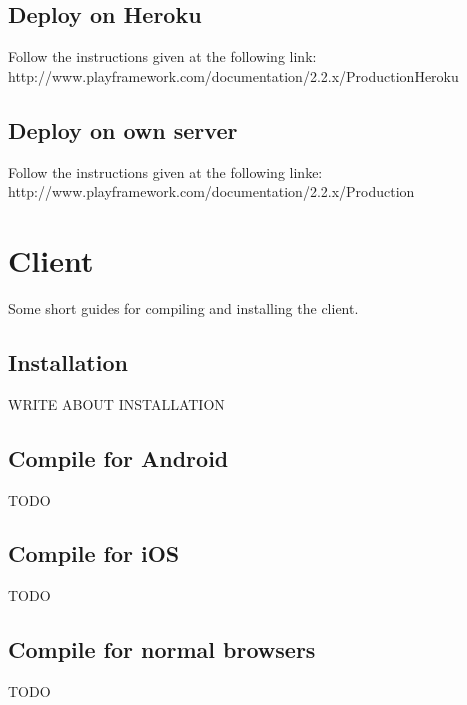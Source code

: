 \documentclass[11pt]{book}
\begin{document}
\subsection{Deploy on Heroku}
Follow the instructions given at the following link:\\
http://www.playframework.com/documentation/2.2.x/ProductionHeroku

\subsection{Deploy on own server}
Follow the instructions given at the following linke:\\
http://www.playframework.com/documentation/2.2.x/Production

\section{Client}
Some short guides for compiling and installing the client.

\subsection{Installation}
WRITE ABOUT INSTALLATION

\subsection{Compile for Android}
TODO

\subsection{Compile for iOS}
TODO

\subsection{Compile for normal browsers}
TODO
\end{document}

